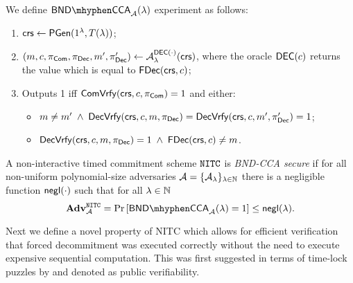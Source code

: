 \begin{definition}
\label{def:nitc-bnd}
We define $\mathsf{BND \mhyphen CCA}_\adv(\secpar)$ experiment as follows:
\begin{enumerate}
\item $\mathsf{crs} \leftarrow \mathsf{PGen}(1{^{\lambda}}, T(\lambda))$;
\item $(m, c, \pi_{\mathsf{Com}}, \pi_{\mathsf{Dec}}, m', \pi_{\mathsf{Dec}}') \leftarrow \mathcal{A}_{\lambda}^{\mathsf{DEC}(\cdot)}(\mathsf{crs})$, where the oracle $\mathsf{DEC}(c)$ returns the value which is equal to $\mathsf{FDec}(\mathsf{crs}, c)$;
\item Outputs 1 iff $\mathsf{ComVrfy}(\mathsf{crs}, c, \pi_{\mathsf{Com}})= 1$ and either:
\begin{itemize}
\item $m \neq m' \; \land \; \mathsf{DecVrfy}(\mathsf{crs}, c, m, \pi_{\mathsf{Dec}}) = \mathsf{DecVrfy}(\mathsf{crs}, c, m', \pi_{\mathsf{Dec}}') = 1$;
\item $\mathsf{DecVrfy}(\mathsf{crs}, c, m, \pi_{\mathsf{Dec}}) = 1 \; \land \; \mathsf{FDec}(\mathsf{crs}, c) \neq m$.
\end{itemize}
\end{enumerate}
A non-interactive timed commitment scheme $\mathtt{NITC}$ is \emph{BND-CCA secure} if for all non-uniform polynomial-size adversaries $\mathcal{A} = \{\mathcal{A}_{\lambda}\}_{\lambda \in \mathbb{N}}$ there is a negligible function $\mathsf{negl}(\cdot)$ such that for all $\lambda \in \mathbb{N}$ 
\[ \advtg^{\nitc}_{\adv} = 
\Pr\left[ \mathsf{BND \mhyphen CCA}_\adv(\secpar) = 1 \right] \leq \negl(\secpar). 
\]
\end{definition}

%

Next we define a novel property of NITC which allows for efficient verification that forced decommitment was executed correctly without the need to execute expensive sequential computation. This was first suggested in terms of time-lock puzzles by \cite{EPRINT:EFKP20a} and denoted as public verifiability.

